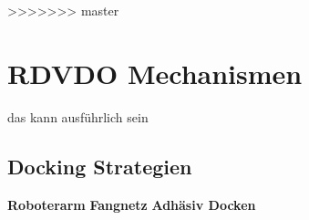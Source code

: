 >>>>>>> master
	\section{RDVDO Mechanismen} das kann ausführlich sein
		\subsection{Docking Strategien}
						\textbf{Roboterarm}
						\textbf{Fangnetz}
						\textbf{Adhäsiv Docken}
		\newpage
		
